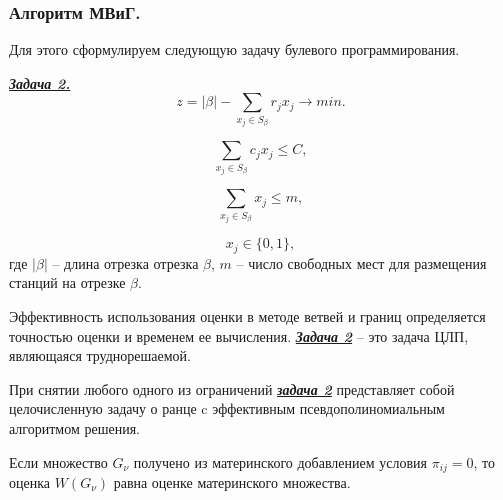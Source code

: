 \begin{frame}
    
    \frametitle{Алгоритм МВиГ.}
    \fontsize{8pt}{7.2}\selectfont
    Для этого сформулируем следующую задачу булевого программирования.

    \underline{\textit{\textbf{Задача 2.}}}
    \begin{displaymath}\label{present:task2}
        z = |\beta| - \sum\limits_{x_j \in S_\beta} r_j x_j \rightarrow min.
    \end{displaymath}

    \begin{displaymath}\label{eq:part4_task2_cost}
        \sum\limits_{x_j \in S_\beta} c_j x_j \leqslant C,
    \end{displaymath}

    \begin{displaymath}\label{eq:part4_task2_m}
        \sum\limits_{x_j \in S_\beta} x_j \leqslant m,
    \end{displaymath}

    \begin{displaymath}
        x_j \in \{0, 1\},
    \end{displaymath}
    где $|\beta|$ -- длина отрезка отрезка  $\beta$, $m$ -- число свободных мест для размещения станций на отрезке $\beta$.

    \bigskip
    Эффективность использования оценки в методе ветвей и границ определяется точностью оценки и временем ее вычисления. \underline{\textit{\textbf{Задача 2}}} -- это задача ЦЛП, являющаяся труднорешаемой. 

    При снятии любого одного из ограничений \underline{\textit{\textbf{задача 2}}} представляет собой целочисленную задачу о ранце c эффективным псевдополиномиальным алгоритмом решения.
    
    \bigskip
    Если множество $G_\nu$ получено из материнского добавлением условия $\pi_{ij}=0$, то оценка $W(G_\nu)$ равна оценке материнского множества.

\end{frame}

